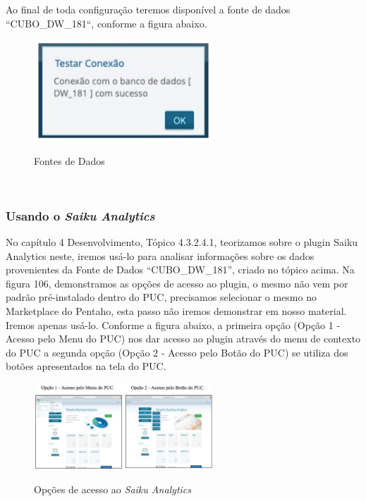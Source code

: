 Ao final de toda configura\c{c}\~{a}o teremos dispon\'{i}vel a fonte de dados ``CUBO_DW_181``, 
conforme a figura abaixo.

\begin{figure}[H]
	\vspace*{0,2cm}
    \centering
    \caption{Fontes de Dados}
    \includegraphics[width=0.6\textwidth]{./04-figuras/figura-puc-testando-uma-nova-conexao}
    \label{fig:ilustfigpuctestandoumanovaconexao}
\end{figure}
\vspace*{-0,9cm}
{\raggedright {}} \\

\subsubsection{Usando o \textit{Saiku Analytics}}

No cap\'{i}tulo 4 Desenvolvimento, T\'{o}pico 4.3.2.4.1, teorizamos sobre o plugin Saiku Analytics neste, iremos us\'{a}-lo 
para analisar informa\c{c}\~{o}es sobre os dados provenientes da Fonte de Dados ``CUBO\_DW\_181'', criado no t\'{o}pico acima.
Na figura 106, demonstramos as op\c{c}\~{o}es de acesso ao plugin, o mesmo n\~{a}o vem por padr\~{a}o pr\'{e}-instalado dentro do PUC, 
precisamos selecionar o mesmo no Marketplace do Pentaho, esta passo n\~{a}o iremos demonstrar em nosso material. Iremos apenas us\'{a}-lo.
Conforme a figura abaixo, a primeira op\c{c}\~{a}o (Op\c{c}\~{a}o 1 - Acesso pelo Menu do PUC) nos dar acesso ao plugin atrav\'{e}s do menu 
de contexto do PUC a segunda op\c{c}\~{a}o (Op\c{c}\~{a}o 2 - Acesso pelo Bot\~{a}o do PUC) se utiliza dos bot\~{o}es apresentados na tela do PUC.

\begin{figure}[H]
	\vspace*{0,2cm}
    \centering
    \caption{Op\c{c}\~{o}es de acesso ao \textit{Saiku Analytics}}
    \includegraphics[width=0.6\textwidth]{./04-figuras/figura-puc-saiku-opcoes-acesso}
    \label{fig:ilustfigpucsaikuopcoesacesso}
\end{figure}
\vspace*{-0,9cm}
{\raggedright {}} \\

